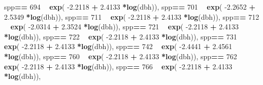 \documentclass[
]{article}
\newenvironment{Shaded}{\begin{snugshade}}{\end{snugshade}}
\newcommand{\DecValTok}[1]{\textcolor[rgb]{0.00,0.00,0.81}{#1}}
\newcommand{\FloatTok}[1]{\textcolor[rgb]{0.00,0.00,0.81}{#1}}
\newcommand{\KeywordTok}[1]{\textcolor[rgb]{0.13,0.29,0.53}{\textbf{#1}}}
\newcommand{\NormalTok}[1]{#1}
\newcommand{\OperatorTok}[1]{\textcolor[rgb]{0.81,0.36,0.00}{\textbf{#1}}}
\newcommand{\StringTok}[1]{\textcolor[rgb]{0.31,0.60,0.02}{#1}}
\begin{document}
\begin{Shaded}
\begin{Highlighting}[]
\NormalTok{    spp}\OperatorTok{==}\StringTok{ }\DecValTok{694} \OperatorTok{~}\StringTok{ }\KeywordTok{exp}\NormalTok{( }\FloatTok{-2.2118}   \OperatorTok{+}\StringTok{    }\FloatTok{2.4133} \OperatorTok{*}\KeywordTok{log}\NormalTok{(dbh)),}
\NormalTok{    spp}\OperatorTok{==}\StringTok{ }\DecValTok{701} \OperatorTok{~}\StringTok{ }\KeywordTok{exp}\NormalTok{( }\FloatTok{-2.2652}   \OperatorTok{+}\StringTok{    }\FloatTok{2.5349} \OperatorTok{*}\KeywordTok{log}\NormalTok{(dbh)),}
\NormalTok{    spp}\OperatorTok{==}\StringTok{ }\DecValTok{711} \OperatorTok{~}\StringTok{ }\KeywordTok{exp}\NormalTok{( }\FloatTok{-2.2118}   \OperatorTok{+}\StringTok{    }\FloatTok{2.4133} \OperatorTok{*}\KeywordTok{log}\NormalTok{(dbh)),}
\NormalTok{    spp}\OperatorTok{==}\StringTok{ }\DecValTok{712} \OperatorTok{~}\StringTok{ }\KeywordTok{exp}\NormalTok{( }\FloatTok{-2.0314}   \OperatorTok{+}\StringTok{    }\FloatTok{2.3524} \OperatorTok{*}\KeywordTok{log}\NormalTok{(dbh)),}
\NormalTok{    spp}\OperatorTok{==}\StringTok{ }\DecValTok{721} \OperatorTok{~}\StringTok{ }\KeywordTok{exp}\NormalTok{( }\FloatTok{-2.2118}   \OperatorTok{+}\StringTok{    }\FloatTok{2.4133} \OperatorTok{*}\KeywordTok{log}\NormalTok{(dbh)),}
\NormalTok{    spp}\OperatorTok{==}\StringTok{ }\DecValTok{722} \OperatorTok{~}\StringTok{ }\KeywordTok{exp}\NormalTok{( }\FloatTok{-2.2118}   \OperatorTok{+}\StringTok{    }\FloatTok{2.4133} \OperatorTok{*}\KeywordTok{log}\NormalTok{(dbh)),}
\NormalTok{    spp}\OperatorTok{==}\StringTok{ }\DecValTok{731} \OperatorTok{~}\StringTok{ }\KeywordTok{exp}\NormalTok{( }\FloatTok{-2.2118}   \OperatorTok{+}\StringTok{    }\FloatTok{2.4133} \OperatorTok{*}\KeywordTok{log}\NormalTok{(dbh)),}
\NormalTok{    spp}\OperatorTok{==}\StringTok{ }\DecValTok{742} \OperatorTok{~}\StringTok{ }\KeywordTok{exp}\NormalTok{( }\FloatTok{-2.4441}   \OperatorTok{+}\StringTok{    }\FloatTok{2.4561} \OperatorTok{*}\KeywordTok{log}\NormalTok{(dbh)),}
\NormalTok{    spp}\OperatorTok{==}\StringTok{ }\DecValTok{760} \OperatorTok{~}\StringTok{ }\KeywordTok{exp}\NormalTok{( }\FloatTok{-2.2118}   \OperatorTok{+}\StringTok{    }\FloatTok{2.4133} \OperatorTok{*}\KeywordTok{log}\NormalTok{(dbh)),}
\NormalTok{    spp}\OperatorTok{==}\StringTok{ }\DecValTok{762} \OperatorTok{~}\StringTok{ }\KeywordTok{exp}\NormalTok{( }\FloatTok{-2.2118}   \OperatorTok{+}\StringTok{    }\FloatTok{2.4133} \OperatorTok{*}\KeywordTok{log}\NormalTok{(dbh)),}
\NormalTok{    spp}\OperatorTok{==}\StringTok{ }\DecValTok{766} \OperatorTok{~}\StringTok{ }\KeywordTok{exp}\NormalTok{( }\FloatTok{-2.2118}   \OperatorTok{+}\StringTok{    }\FloatTok{2.4133} \OperatorTok{*}\KeywordTok{log}\NormalTok{(dbh)),}

\end{Highlighting}
\end{Shaded}
\end{document}
